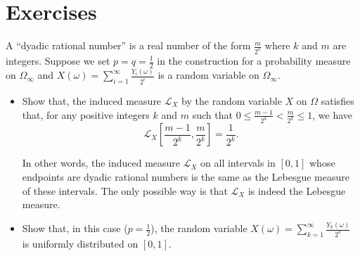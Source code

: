 \documentclass{report}
\begin{document}
\section{Exercises}
\begin{question}{}{}
A ``dyadic rational number'' is a real number of the form $\frac{m}{2^k}$ where $k$ and $m$ are integers. Suppose we set $p = q = \frac{1}{2}$ in the construction for a probability measure on $\Omega_{\infty}$ and $X(\omega) = \sum_{i=1}^{\infty} \frac{Y_i(\omega)}{2^i}$ is a random variable on $\Omega_{\infty}$.

\begin{itemize}
  \item Show that, the induced measure $\mathcal{L}_X$ by the random variable $X$ on $\Omega$ satisfies that, for any positive integers $k$ and $m$ such that $0 \leq \frac{m-1}{2^k} < \frac{m}{2^k} \leq 1$, we have
  \[
  \mathcal{L}_X\left[\frac{m-1}{2^k}, \frac{m}{2^k}\right] = \frac{1}{2^k}.
  \]
  
  In other words, the induced measure $\mathcal{L}_X$ on all intervals in $[0, 1]$ whose endpoints are dyadic rational numbers is the same as the Lebesgue measure of these intervals. The only possible way is that $\mathcal{L}_X$ is indeed the Lebesgue measure.
  
  \item Show that, in this case ($p = \frac{1}{2}$), the random variable $X(\omega) = \sum_{k=1}^{\infty} \frac{Y_k(\omega)}{2^k}$ is uniformly distributed on $[0, 1]$.
\end{itemize}
\end{question}
\end{document}
